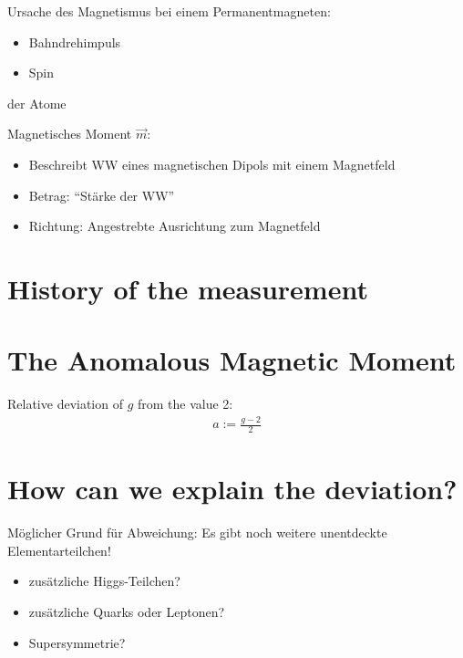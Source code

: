 \documentclass[12pt]{beamer}
\begin{document}
\begin{frame}{\insertsection}
  Ursache des Magnetismus bei einem Permanentmagneten:
  \begin{itemize}
  \item Bahndrehimpuls
  \item Spin
  \end{itemize}
  der Atome
\end{frame}

\begin{frame}{\insertsection}
  Magnetisches Moment $\vec{m}$:
  \begin{itemize}
  \item Beschreibt WW eines magnetischen Dipols mit einem Magnetfeld
  \item Betrag: "`Stärke der WW"'
  \item Richtung: Angestrebte Ausrichtung zum Magnetfeld
  \end{itemize}
\end{frame}


\section{History of the measurement}

\begin{frame}{\insertsection}
\end{frame}


\section{The Anomalous Magnetic Moment}

\begin{frame}{\insertsection}
  Relative deviation of $g$ from the value 2:
  \begin{align*}
    a := \frac{g-2}{2}
  \end{align*}
\end{frame}


\section{How can we explain the deviation?}

\begin{frame}{\insertsection}
  Möglicher Grund für Abweichung: Es gibt noch weitere unentdeckte
  Elementarteilchen!
  \begin{itemize}
  \item zusätzliche Higgs-Teilchen?
  \item zusätzliche Quarks oder Leptonen?
  \item Supersymmetrie?
  \end{itemize}
\end{frame}
\end{document}
